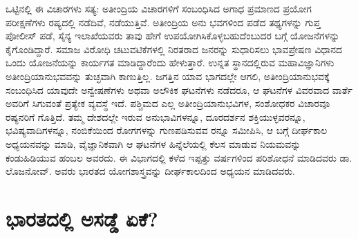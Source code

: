 ಒಟ್ಟಿನಲ್ಲಿ ಈ ವಿಚಾರಗಳು ಸತ್ಯ: ಅತೀಂದ್ರಿಯ ವಿಚಾರಗಳಿಗೆ ಸಂಬಂಧಿಸಿದ ಅಗಾಧ ಪ್ರಮಾಣದ ಪ್ರಯೋಗ ಪರೀಕ್ಷಣೆಗಳು ರಷ್ಯದಲ್ಲಿ ನಡೆದಿವೆ, ನಡೆಯುತ್ತಿವೆ. ಅತೀಂದ್ರಿಯ ಅನು ಭವಗಳಿಂದ ಪಡೆದ ತಥ್ಯಗಳನ್ನು ಗುಪ್ತ ಪೋಲೀಸ್ ಪಡೆ, ಸೈನ್ಯ ಇಲಾಖೆಯವರು ತಾವು ಹೇಗೆ ಉಪಯೋಗಿಸಿಕೊಳ್ಳಬಹುದೆಂಬುದರ ಬಗ್ಗೆ ಯೋಜನೆಗಳನ್ನು ಕೈಗೊಂಡಿದ್ದಾರೆ. ಸಮಾಜ ವಿರೋಧಿ ಚಟುವಟಿಕೆಗಳಲ್ಲಿ ನಿರತರಾದ ಜನರನ್ನು ಸುಧಾರಿಸಲು ಭಾವಪ್ರೇಷಣ ವಿಧಾನದ ಒಂದು ಯೋಜನೆಯನ್ನು ಕಾರ್ಯಗತ ಮಾಡಿದ್ದಾರೆಂದು ಹೇಳುತ್ತಾರೆ. ಉನ್ನತ ಸ್ಥಾನದಲ್ಲಿರುವ ಮಹಾವಿಜ್ಞಾನಿಗಳು ಅತೀಂದ್ರಿಯಾನುಭವವನ್ನು ತುಚ್ಛವಾಗಿ ಕಾಣುತ್ತಿಲ್ಲ. ಜಗತ್ತಿನ ಯಾವ ಭಾಗದಲ್ಲೇ ಆಗಲಿ, ಅತೀಂದ್ರಿಯಾನುಭವಕ್ಕೆ ಸಂಬಂಧಿಸಿದ ಯಾವುದೇ ಅನ್ವೇಷಣೆಗಳು ಅಥವಾ ಅಲೌಕಿಕ ಘಟನೆಗಳು ನಡೆದರೂ, ಆ ಘಟನೆಗಳ ವಿವರವಾದ ವಾರ್ತೆ ಅವರಿಗೆ ಸಿಗುವಂತೆ ಪ್ರತ್ಯೇಕ ವ್ಯವಸ್ಥೆ ಇದೆ. ಪಶ್ಚಿಮದ ಎಲ್ಲ ಅತೀಂದ್ರಿಯಾನುಭವಿಗಳ, ಸಂಶೋಧಕರ ವಿಚಾರವೂ ರಷ್ಯನರಿಗೆ ಗೊತ್ತಿದೆ. ತಮ್ಮ ದೇಶದಲ್ಲೇ ಇರುವ ಅನುಭಾವಿಗಳನ್ನೂ, ದೂರದರ್ಶನ ಶಕ್ತಿಯುಳ್ಳವರನ್ನೂ, ಭವಿಷ್ಯವಾದಿಗಳನ್ನೂ, ನಂಬಿಕೆಯಿಂದ ರೋಗಗಳನ್ನು ಗುಣಪಡಿಸುವವ ರನ್ನೂ ಸಮೀಪಿಸಿ, ಆ ಬಗ್ಗೆ ದೀರ್ಘಕಾಲ ಅಧ್ಯಯನವನ್ನು ಮಾಡಿ, ವೈಜ್ಞಾನಿಕವಾಗಿ ಆ ಘಟನೆಗಳ ಹಿನ್ನೆಲೆಯಲ್ಲಿ ಕೆಲಸ ಮಾಡುವ ನಿಯಮವನ್ನು ಕಂಡುಹಿಡಿಯುವ ಹಂಬಲ ಅವರದು. ಈ ವಿಭಾಗದಲ್ಲಿ ಕಳೆದ ಇಪ್ಪತ್ತು ವರ್ಷಗಳಿಂದ ಪರಿಶೋಧನೆ ಮಾಡಿದವರು ಡಾ. ಲೊಜನೋವ್. ಅವರು ಭಾರತದ ಯೋಗಶಾಸ್ತ್ರವನ್ನು ದೀರ್ಘಕಾಲದಿಂದ ಅಧ್ಯಯನ ಮಾಡಿದವರು.


\section{ಭಾರತದಲ್ಲಿ ಅಸಡ್ಡೆ ಏಕೆ?}

